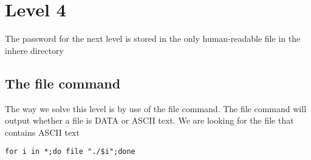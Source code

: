 \documentclass{report}
\begin{document}
    \bigbreak \noindent 
    \section*{Level 4} 
    \bigbreak \noindent 
    The password for the next level is stored in the only human-readable file in the inhere directory
    \bigbreak \noindent 
    \subsection*{The file command}
    The way we solve this level is by use of the file command. The file command will output whether a file is DATA or ASCII text. We are looking for the file that contains ASCII text
    \bigbreak \noindent 
    \begin{verbatim}
for i in *;do file "./$i";done
    \end{verbatim}
    \bigbreak \noindent
\end{document}
